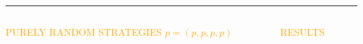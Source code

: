 \documentclass[usenames,dvipsnames,t]{beamer}
\begin{document}
\hrule height 3pt
\begin{columns}
    \begin{column}{.8\linewidth}
        \begin{center}
            \textcolor{orange}{\Large{PURELY RANDOM STRATEGIES \(p=(p, p, p, p)\)}}
            \vspace{1cm}
        \end{center}
    \end{column}
    \begin{column}{.2\linewidth}
        \begin{center}
            \textcolor{orange}{\Large{RESULTS}}
        \end{center}
    \end{column}
\end{columns}
\end{document}

